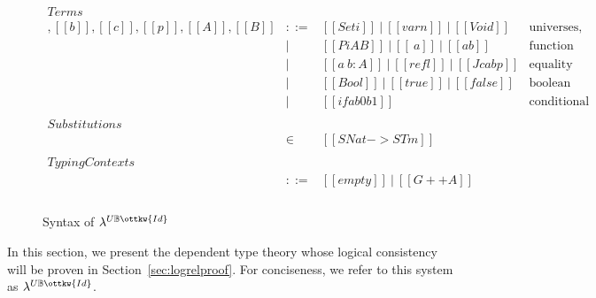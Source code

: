 \documentclass[acmsmall,screen=true,
\ifpublic review=false\else,review=true\fi
  ,anonymous=\ifanonymous true\else false\fi]{acmart}
\newcommand{\lang}{$\lambda^{U\mathbb{B}\ottkw{Id}}$\xspace}
\newcommand{\scw}[1]{}
\newcommand{\yl}[1]{}
\begin{document}
\begin{figure}[h]
\[
\begin{array}{lcll}
\mathit{Terms}\\
[[a]],[[b]],[[c]],[[p]],[[A]],[[B]] & ::= & [[Set i]]\ |\ [[var n]]\  |\ [[Void]]
                  & \mbox{universes, variables, empty type} \\
            & |   & [[Pi A B]]\ |\ [[\ a]]\ |\ [[a b]]
                  & \mbox{function types, abstractions, applications} \\
            & |   & [[a ~ b : A ]]\ |\  [[refl]]\ |\ [[J c a b p]]
                  & \mbox{equality types, reflexivity proof, J eliminator} \\
            & |   & [[Bool]]\ |\  [[true]]\ |\  [[false]]\ %
                  & \mbox{boolean type, true, false} \\
            & |   & [[if a b0 b1]]
                  & \mbox{conditional expression} \\ \\
\mathit{Substitutions}\\
[[rho]] & \in & [[SNat -> STm]] & \\ \\
\mathit{Typing Contexts}\\
 [[G]]       & ::= & [[empty]]\ |\ [[G ++ A]] &  \\ \\
\end{array}
\]
  \caption{Syntax of \lang \scw{Where does the name come from?}\yl{H =
    hierarchy though it needs a better name}}
  \label{fig:syntax}
\end{figure}


In this section, we present the dependent type theory whose logical
consistency will be proven in Section~\ref{sec:logrelproof}. For conciseness,
we refer to this system as \lang.
\end{document}

